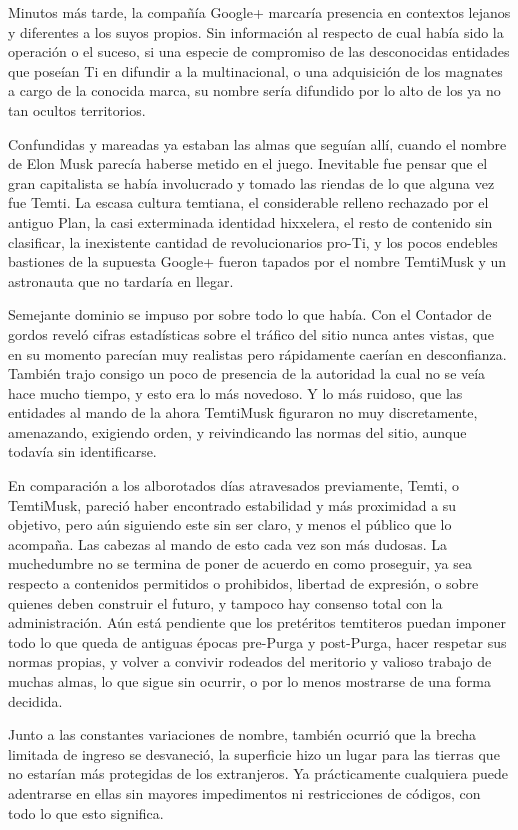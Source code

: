 \documentclass[
]{book}
\begin{document}
Minutos más tarde, la compañía Google+ marcaría presencia en contextos lejanos y diferentes a los suyos propios. Sin información al respecto de cual había sido la operación o el suceso, si una especie de compromiso de las desconocidas entidades que poseían Ti en difundir a la multinacional, o una adquisición de los magnates a cargo de la conocida marca, su nombre sería difundido por lo alto de los ya no tan ocultos territorios.

Confundidas y mareadas ya estaban las almas que seguían allí, cuando el nombre de Elon Musk parecía haberse metido en el juego. Inevitable fue pensar que el gran capitalista se había involucrado y tomado las riendas de lo que alguna vez fue Temti. La escasa cultura temtiana, el considerable relleno rechazado por el antiguo Plan, la casi exterminada identidad hixxelera, el resto de contenido sin clasificar, la inexistente cantidad de revolucionarios pro-Ti, y los pocos endebles bastiones de la supuesta Google+ fueron tapados por el nombre TemtiMusk y un astronauta que no tardaría en llegar.

Semejante dominio se impuso por sobre todo lo que había. Con el Contador de gordos reveló cifras estadísticas sobre el tráfico del sitio nunca antes vistas, que en su momento parecían muy realistas pero rápidamente caerían en desconfianza. También trajo consigo un poco de presencia de la autoridad la cual no se veía hace mucho tiempo, y esto era lo más novedoso. Y lo más ruidoso, que las entidades al mando de la ahora TemtiMusk figuraron no muy discretamente, amenazando, exigiendo orden, y reivindicando las normas del sitio, aunque todavía sin identificarse.

En comparación a los alborotados días atravesados previamente, Temti, o TemtiMusk, pareció haber encontrado estabilidad y más proximidad a su objetivo, pero aún siguiendo este sin ser claro, y menos el público que lo acompaña. Las cabezas al mando de esto cada vez son más dudosas. La muchedumbre no se termina de poner de acuerdo en como proseguir, ya sea respecto a contenidos permitidos o prohibidos, libertad de expresión, o sobre quienes deben construir el futuro, y tampoco hay consenso total con la administración. Aún está pendiente que los pretéritos temtiteros puedan imponer todo lo que queda de antiguas épocas pre-Purga y post-Purga, hacer respetar sus normas propias, y volver a convivir rodeados del meritorio y valioso trabajo de muchas almas, lo que sigue sin ocurrir, o por lo menos mostrarse de una forma decidida.

Junto a las constantes variaciones de nombre, también ocurrió que la brecha limitada de ingreso se desvaneció, la superficie hizo un lugar para las tierras que no estarían más protegidas de los extranjeros. Ya prácticamente cualquiera puede adentrarse en ellas sin mayores impedimentos ni restricciones de códigos, con todo lo que esto significa.
\end{document}
